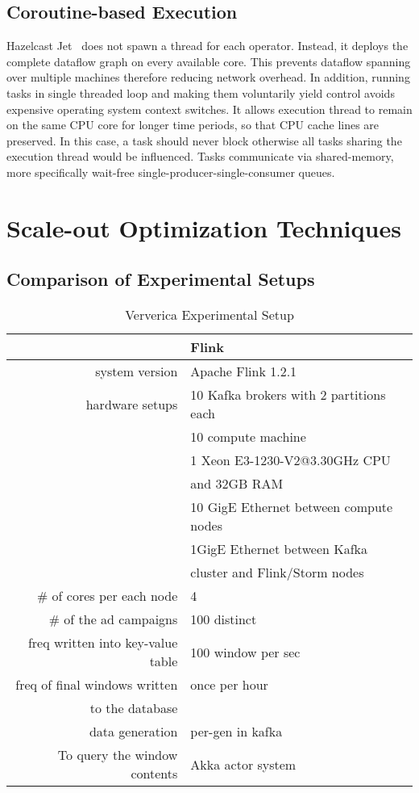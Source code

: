 \documentclass[runningheads]{llncs}
\begin{document}
\subsection{Coroutine-based Execution} 
Hazelcast Jet~\cite{Hazelcast} does not spawn a thread for each operator.
Instead, it deploys the complete dataflow graph on every available core. This
prevents dataflow spanning over multiple machines therefore reducing network
overhead. In addition, running tasks in single threaded loop and making them 
voluntarily yield control avoids expensive operating system context switches.
It allows execution thread to remain on the same CPU core for longer time
periods, so that CPU cache lines are preserved. In this case, a task should
never block otherwise all tasks sharing the execution thread would be
influenced. Tasks communicate via shared-memory, more specifically wait-free
single-producer-single-consumer queues.

\section{Scale-out Optimization Techniques}

\subsection{Comparison of Experimental Setups}

\begin{table}[ht]
  \centering
  \begin{tabular}{|r|l|}
  \hline
  & Flink
  \\ \hline
  system version & Apache Flink 1.2.1
  \\ \hline
  hardware setups & 10 Kafka brokers with 2 partitions each
  \\ \hline
   & 10 compute machine
  \\ \hline
   & 1 Xeon E3-1230-V2@3.30GHz CPU 
   \\
   & and 32GB RAM
   \\ \hline
   & 10 GigE Ethernet between compute nodes 
   \\ \hline
   & 1GigE Ethernet between Kafka 
   \\
   & cluster and Flink/Storm nodes
   \\ \hline
   \# of cores per each node & 4
   \\ \hline
   \# of the ad campaigns & 100 distinct
   \\ \hline
   freq written into key-value table & 100 window per sec
   \\ \hline
   freq of final windows written & once per hour
   \\
   to the database &
   \\ \hline
   data generation & per-gen in kafka
   \\ \hline
   To query the window contents & Akka actor system
   \\ \hline
  \end{tabular}
  \caption{Ververica Experimental Setup}
  \end{table}
  
\end{document}
